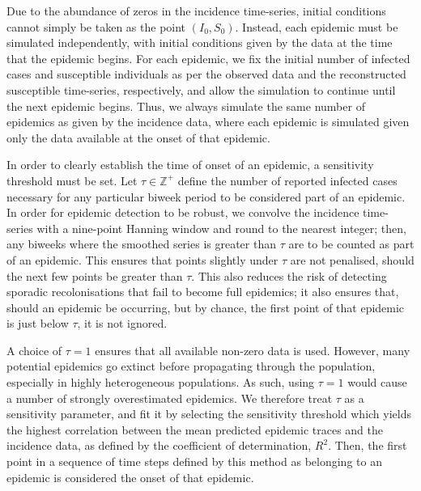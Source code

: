 \documentclass[10pt]{article}
\begin{document}
Due to the abundance of zeros in the incidence time-series, initial conditions cannot simply be taken as the point $\left(I_0, S_0\right)$. Instead, each epidemic must be simulated independently, with initial conditions given by the data at the time that the epidemic begins. For each epidemic, we fix the initial number of infected cases and susceptible individuals as per the observed data and the reconstructed susceptible time-series, respectively, and allow the simulation to continue until the next epidemic begins. Thus, we always simulate the same number of epidemics as given by the incidence data, where each epidemic is simulated given only the data available at the onset of that epidemic. 

In order to clearly establish the time of onset of an epidemic, a sensitivity threshold must be set. Let $\tau \in \mathbb{Z}^+$ define the number of reported infected cases necessary for any particular biweek period to be considered part of an epidemic. In order for epidemic detection to be robust, we convolve the incidence time-series with a nine-point Hanning window and round to the nearest integer; then, any biweeks where the smoothed series is greater than $\tau$ are to be counted as part of an epidemic. This ensures that points slightly under $\tau$ are not penalised, should the next few points be greater than $\tau$. This also reduces the risk of detecting sporadic recolonisations that fail to become full epidemics; it also ensures that, should an epidemic be occurring, but by chance, the first point of that epidemic is just below $\tau$, it is not ignored. 

A choice of $\tau = 1$ ensures that all available non-zero data is used. However, many potential epidemics go extinct before propagating through the population, especially in highly heterogeneous populations. As such, using $\tau=1$ would cause a number of strongly overestimated epidemics. We therefore treat $\tau$ as a sensitivity parameter, and fit it by selecting the sensitivity threshold which yields the highest correlation between the mean predicted epidemic traces and the incidence data, as defined by the coefficient of determination, $R^2$. Then, the first point in a sequence of time steps defined by this method as belonging to an epidemic is considered the onset of that epidemic.
\end{document}
